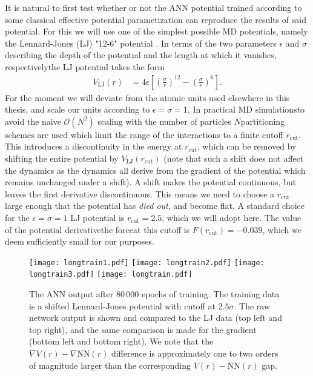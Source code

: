\documentclass[../../master.tex]{subfiles}
\begin{document}
\newcommand{\rc}{r_\text{cut}}
It is natural to first test whether or not the ANN potential trained according to some classical effective potential parametization can reproduce the results of said potential. For this we will use one of the simplest possible MD potentials, namely the Lennard-Jones (LJ) "12-6" potential \cite{Jones463}. In terms of the two parameters $\epsilon$ and $\sigma$\textemdash describing the depth of the potential and the length at which it vanishes, respectively\textemdash the LJ potential takes the form
\begin{align}
V_\text{LJ}(r) &= 4\epsilon \left[\left(\frac{\sigma}{r}\right)^{12} - \left(\frac{\sigma}{r}\right)^6\right]. 
\end{align}
For the moment we will deviate from the atomic units used elsewhere in this thesis, and scale our units according to $\epsilon=\sigma=1$. In practical MD simulations\textemdash  to avoid the naive $\mathcal{O}(N^2)$ scaling with the number of particles $N$\textemdash partitioning schemes are used which limit the range of the interactions to a finite cutoff $r_\text{cut}$. This introduces a discontinuity in the energy at $\rc$, which can be removed by shifting the entire potential by $V_\text{LJ}(\rc)$ (note that such a shift does not affect the dynamics as the dynamics all derive from the gradient of the potential which remains unchanged under a shift). A shift makes the potential continuous, but leaves the first derivative discontinuous. This means we need to choose a $\rc$ large enough that the potential has \emph{died out}, and become flat. A standard choice for the $\epsilon=\sigma=1$ LJ potential is $\rc=2.5$, which we will adopt here. The value of the 
potential derivative\textemdash the force\textemdash at this cutoff is $F(\rc)=-0.039$, which we deem sufficiently small for our purposes.

\begin{figure}
\centering
\texttt{[image: longtrain1.pdf]}
\texttt{[image: longtrain2.pdf]}
\texttt{[image: longtrain3.pdf]}
\texttt{[image: longtrain.pdf]}
\caption{The ANN output after 80\,000 epochs of training. The training data is a shifted Lennard-Jones potential with cutoff at $2.5\sigma$. The raw network output is shown and compared to the LJ data (top left and top right), and the same comparison is made for the gradient (bottom left and bottom right). We note that the $\nabla V(r)-\nabla \text{NN}(r)$ difference is approximately one to two orders of magnitude larger than the corresponding $V(r)-\text{NN}(r)$ gap.  \label{fig:longtrain}}
\end{figure}
\end{document}

